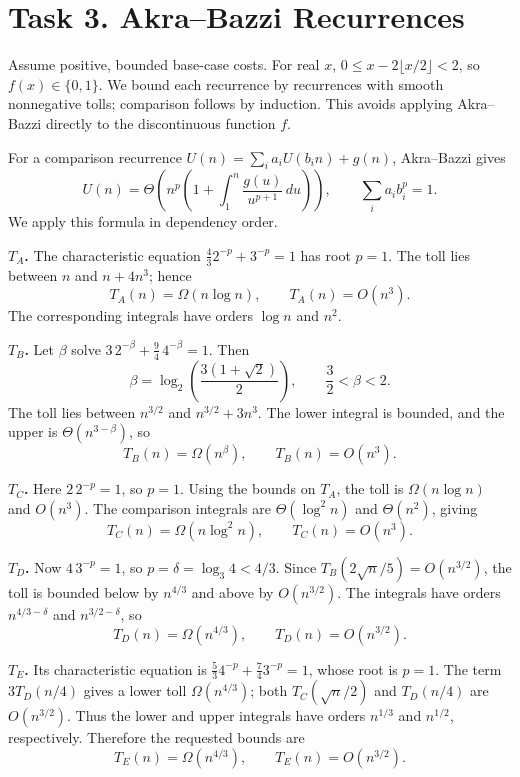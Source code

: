 \documentclass[11pt]{article}
\begin{document}
\newpage
\section*{Task 3. Akra--Bazzi Recurrences}

Assume positive, bounded base-case costs. For real $x$,
$0\leq x-2\lfloor x/2\rfloor<2$, so $f(x)\in\{0,1\}$.
We bound each recurrence by recurrences with smooth nonnegative tolls;
comparison follows by induction. This avoids applying Akra--Bazzi
directly to the discontinuous function $f$.

For a comparison recurrence $U(n)=\sum_i a_iU(b_in)+g(n)$,
Akra--Bazzi gives
\[
U(n)=\Theta\!\left(n^p\left(1+\int_1^n
\frac{g(u)}{u^{p+1}}\,du\right)\right),
\qquad \sum_i a_ib_i^p=1.
\]
We apply this formula in dependency order.

\textbf{$T_A$.} The characteristic equation
$\frac43 2^{-p}+3^{-p}=1$ has root $p=1$.
The toll lies between $n$ and $n+4n^3$; hence
\[
T_A(n)=\Omega(n\log n),\qquad T_A(n)=O(n^3).
\]
The corresponding integrals have orders $\log n$ and $n^2$.

\textbf{$T_B$.} Let $\beta$ solve $3\,2^{-\beta}+\frac94\,4^{-\beta}=1$.
Then
\[
\beta=\log_2\!\left(\frac{3(1+\sqrt2)}2\right),\qquad
\frac32<\beta<2.
\]
The toll lies between $n^{3/2}$ and $n^{3/2}+3n^3$.
The lower integral is bounded, and the upper is $\Theta(n^{3-\beta})$, so
\[
T_B(n)=\Omega(n^\beta),\qquad T_B(n)=O(n^3).
\]

\textbf{$T_C$.} Here $2\,2^{-p}=1$, so $p=1$.
Using the bounds on $T_A$, the toll is
$\Omega(n\log n)$ and $O(n^3)$.
The comparison integrals are $\Theta(\log^2 n)$ and $\Theta(n^2)$, giving
\[
T_C(n)=\Omega(n\log^2 n),\qquad T_C(n)=O(n^3).
\]

\textbf{$T_D$.} Now $4\,3^{-p}=1$, so $p=\delta=\log_3 4<4/3$.
Since $T_B(2\sqrt n/5)=O(n^{3/2})$, the toll is bounded below by
$n^{4/3}$ and above by $O(n^{3/2})$.
The integrals have orders $n^{4/3-\delta}$ and $n^{3/2-\delta}$, so
\[
T_D(n)=\Omega(n^{4/3}),\qquad T_D(n)=O(n^{3/2}).
\]

\textbf{$T_E$.} Its characteristic equation is
$\frac53 4^{-p}+\frac74 3^{-p}=1$, whose root is $p=1$.
The term $3T_D(n/4)$ gives a lower toll $\Omega(n^{4/3})$;
both $T_C(\sqrt n/2)$ and $T_D(n/4)$ are $O(n^{3/2})$.
Thus the lower and upper integrals have orders $n^{1/3}$ and $n^{1/2}$,
respectively. Therefore the requested bounds are
\[
\boxed{T_E(n)=\Omega(n^{4/3}),\qquad T_E(n)=O(n^{3/2}).}
\]
\end{document}
